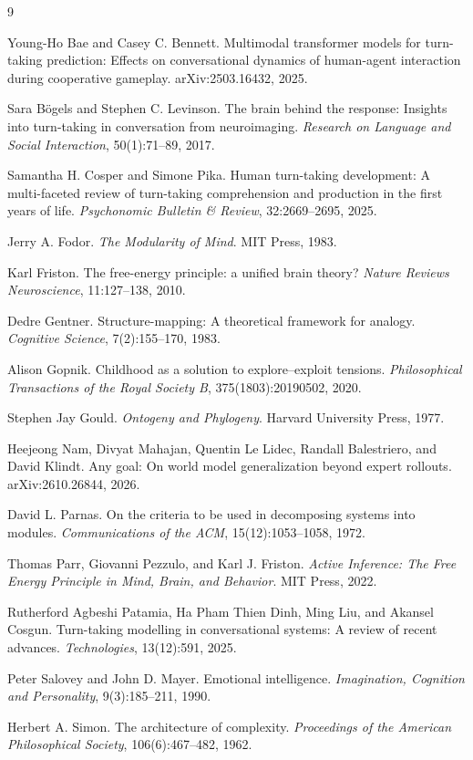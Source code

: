 \documentclass[12pt, a4paper]{article}
\begin{document}
\begin{thebibliography}{9}

Young-Ho Bae and Casey C. Bennett.
Multimodal transformer models for turn-taking prediction: Effects on conversational dynamics of human-agent interaction during cooperative gameplay.
arXiv:2503.16432, 2025.

Sara B\"ogels and Stephen C. Levinson.
The brain behind the response: Insights into turn-taking in conversation from neuroimaging.
\textit{Research on Language and Social Interaction}, 50(1):71--89, 2017.

Samantha H. Cosper and Simone Pika.
Human turn-taking development: A multi-faceted review of turn-taking comprehension and production in the first years of life.
\textit{Psychonomic Bulletin \& Review}, 32:2669--2695, 2025.

Jerry A. Fodor.
\textit{The Modularity of Mind}.
MIT Press, 1983.

Karl Friston.
The free-energy principle: a unified brain theory?
\textit{Nature Reviews Neuroscience}, 11:127--138, 2010.

Dedre Gentner.
Structure-mapping: A theoretical framework for analogy.
\textit{Cognitive Science}, 7(2):155--170, 1983.

Alison Gopnik.
Childhood as a solution to explore--exploit tensions.
\textit{Philosophical Transactions of the Royal Society B}, 375(1803):20190502, 2020.

Stephen Jay Gould.
\textit{Ontogeny and Phylogeny}.
Harvard University Press, 1977.

Heejeong Nam, Divyat Mahajan, Quentin Le Lidec, Randall Balestriero, and David Klindt.
Any goal: On world model generalization beyond expert rollouts.
arXiv:2610.26844, 2026.

David L. Parnas.
On the criteria to be used in decomposing systems into modules.
\textit{Communications of the ACM}, 15(12):1053--1058, 1972.

Thomas Parr, Giovanni Pezzulo, and Karl J. Friston.
\textit{Active Inference: The Free Energy Principle in Mind, Brain, and Behavior}.
MIT Press, 2022.

Rutherford Agbeshi Patamia, Ha Pham Thien Dinh, Ming Liu, and Akansel Cosgun.
Turn-taking modelling in conversational systems: A review of recent advances.
\textit{Technologies}, 13(12):591, 2025.

Peter Salovey and John D. Mayer.
Emotional intelligence.
\textit{Imagination, Cognition and Personality}, 9(3):185--211, 1990.

Herbert A. Simon.
The architecture of complexity.
\textit{Proceedings of the American Philosophical Society}, 106(6):467--482, 1962.

\end{thebibliography}
\end{document}
